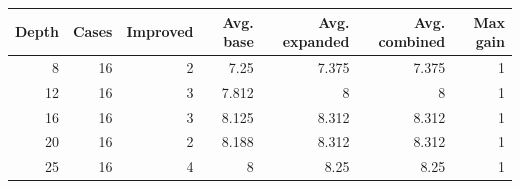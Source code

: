 {\small
\begin{tabular}{rrrrrrr}
\hline
Depth & Cases & Improved & Avg. base & Avg. expanded & Avg. combined & Max gain \\
\hline
8 & 16 & 2 & 7.25 & 7.375 & 7.375 & 1 \\
12 & 16 & 3 & 7.812 & 8 & 8 & 1 \\
16 & 16 & 3 & 8.125 & 8.312 & 8.312 & 1 \\
20 & 16 & 2 & 8.188 & 8.312 & 8.312 & 1 \\
25 & 16 & 4 & 8 & 8.25 & 8.25 & 1 \\
\hline
\end{tabular}
}
